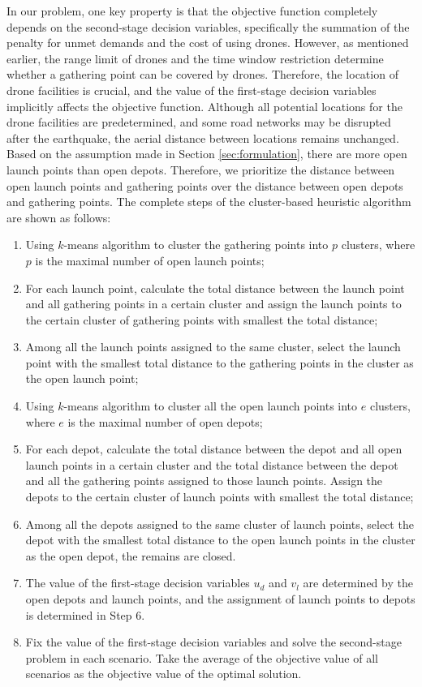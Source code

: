 \documentclass[preprint,review,11pt,authoryear]{elsarticle}
\begin{document}
In our problem, one key property is that the objective function completely depends on the second-stage decision variables, specifically the summation of the penalty for unmet demands and the cost of using drones. However, as mentioned earlier, the range limit of drones and the time window restriction determine whether a gathering point can be covered by drones. Therefore, the location of drone facilities is crucial, and the value of the first-stage decision variables implicitly affects the objective function. Although all potential locations for the drone facilities are predetermined, and some road networks may be disrupted after the earthquake, the aerial distance between locations remains unchanged. Based on the assumption made in Section \ref{sec:formulation}, there are more open launch points than open depots. Therefore, we prioritize the distance between open launch points and gathering points over the distance between open depots and gathering points. The complete steps of the cluster-based heuristic algorithm are shown as follows:
\begin{enumerate}[itemsep=0em]
    \item Using $k$-means algorithm to cluster the gathering points into $p$ clusters, where $p$ is the maximal number of open launch points;
    \item For each launch point, calculate the total distance between the launch point and all gathering points in a certain cluster and assign the launch points to the certain cluster of gathering points with smallest the total distance;
    \item Among all the launch points assigned to the same cluster, select the launch point with the smallest total distance to the gathering points in the cluster as the open launch point;
    \item Using $k$-means algorithm to cluster all the open launch points into $e$ clusters, where $e$ is the maximal number of open depots;
    \item For each depot, calculate the total distance between the depot and all open launch points in a certain cluster and the total distance between the depot and all the gathering points assigned to those launch points. Assign the depots to the certain cluster of launch points with smallest the total distance;
    \item Among all the depots assigned to the same cluster of launch points, select the depot with the smallest total distance to the open launch points in the cluster as the open depot, the remains are closed.
    \item The value of the first-stage decision variables $u_d$ and $v_l$ are determined by the open depots and launch points, and the assignment of launch points to depots is determined in Step 6.
    \item Fix the value of the first-stage decision variables and solve the second-stage problem in each scenario. Take the average of the objective value of all scenarios as the objective value of the optimal solution.
\end{enumerate}
\end{document}
